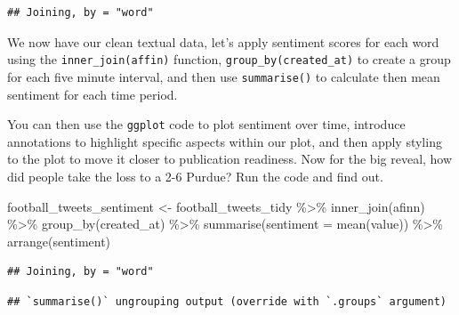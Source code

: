 \documentclass[
]{book}
\newenvironment{Shaded}{\begin{snugshade}}{\end{snugshade}}
\newcommand{\AttributeTok}[1]{\textcolor[rgb]{0.77,0.63,0.00}{#1}}
\newcommand{\FunctionTok}[1]{\textcolor[rgb]{0.00,0.00,0.00}{#1}}
\newcommand{\NormalTok}[1]{#1}
\newcommand{\OtherTok}[1]{\textcolor[rgb]{0.56,0.35,0.01}{#1}}
\newcommand{\SpecialCharTok}[1]{\textcolor[rgb]{0.00,0.00,0.00}{#1}}
\begin{document}
\begin{verbatim}
## Joining, by = "word"
\end{verbatim}

We now have our clean textual data, let's apply sentiment scores for each word using the \texttt{inner\_join(affin)} function, \texttt{group\_by(created\_at)} to create a group for each five minute interval, and then use \texttt{summarise()} to calculate then mean sentiment for each time period.

You can then use the \texttt{ggplot} code to plot sentiment over time, introduce annotations to highlight specific aspects within our plot, and then apply styling to the plot to move it closer to publication readiness. Now for the big reveal, how did people take the loss to a 2-6 Purdue? Run the code and find out.

\begin{Shaded}
\begin{Highlighting}[]
\NormalTok{football\_tweets\_sentiment }\OtherTok{\textless{}{-}}\NormalTok{ football\_tweets\_tidy }\SpecialCharTok{\%\textgreater{}\%}
  \FunctionTok{inner\_join}\NormalTok{(afinn) }\SpecialCharTok{\%\textgreater{}\%} 
  \FunctionTok{group\_by}\NormalTok{(created\_at) }\SpecialCharTok{\%\textgreater{}\%} 
  \FunctionTok{summarise}\NormalTok{(}\AttributeTok{sentiment =} \FunctionTok{mean}\NormalTok{(value)) }\SpecialCharTok{\%\textgreater{}\%} 
  \FunctionTok{arrange}\NormalTok{(sentiment)}
\end{Highlighting}
\end{Shaded}

\begin{verbatim}
## Joining, by = "word"
\end{verbatim}

\begin{verbatim}
## `summarise()` ungrouping output (override with `.groups` argument)
\end{verbatim}
\end{document}
